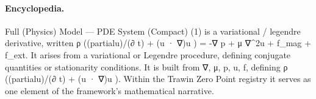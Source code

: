 \paragraph{Encyclopedia.}
Full (Physics) Model — PDE System (Compact) (1) is a variational / legendre derivative, written ρ ((partialu)/(∂ t) + (u · ∇)u ) = -∇ p + μ ∇\textasciicircum{}2u + f\_mag + f\_ext. It arises from a variational or Legendre procedure, defining conjugate quantities or stationarity conditions. It is built from ∇, μ, p, u, f, defining ρ ((partialu)/(∂ t) + (u · ∇)u ). Within the Trawin Zero Point registry it serves as one element of the framework's mathematical narrative.
